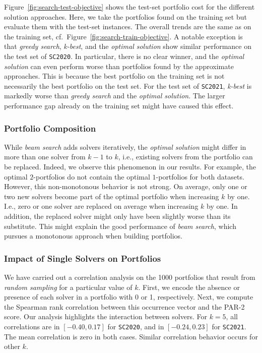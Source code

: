 \documentclass[a4paper,USenglish,pdfa]{lipics-v2021} %
\begin{document}
Figure~\ref{fig:search-test-objective} shows the test-set portfolio cost for the different solution approaches.
Here, we take the portfolios found on the training set but evaluate them with the test-set instances.
The overall trends are the same as on the training set, cf.~Figure~\ref{fig:search-train-objective}.
A notable exception is that \emph{greedy search}, \emph{k-best}, and the \emph{optimal solution} show similar performance on the test set of \texttt{SC2020}.
In particular, there is no clear winner, and the \emph{optimal solution} can even perform worse than portfolios found by the approximate approaches. 
This is because the best portfolio on the training set is not necessarily the best portfolio on the test set.
For the test set of \texttt{SC2021}, \emph{k-best} is markedly worse than \emph{greedy search} and the \emph{optimal solution}. 
The larger performance gap already on the training set might have caused this effect.

\subsubsection{Portfolio Composition}

While \emph{beam search} adds solvers iteratively, the \emph{optimal solution} might differ in more than one solver from $k-1$ to $k$, i.e., existing solvers from the portfolio can be replaced.
Indeed, we observe this phenomenon in our results.
For example, the optimal $2$-portfolios do not contain the optimal $1$-portfolios for both datasets.
However, this non-monotonous behavior is not strong.
On average, only one or two new solvers become part of the optimal portfolio when increasing $k$ by one.
I.e., zero or one solver are replaced on average when increasing $k$ by one.
In addition, the replaced solver might only have been slightly worse than its substitute.
This might explain the good performance of \emph{beam search}, which pursues a monotonous approach when building portfolios.

\subsubsection{Impact of Single Solvers on Portfolios}

We have carried out a correlation analysis on the 1000 portfolios that result from \emph{random sampling} for a particular value of $k$. 
First, we encode the absence or presence of each solver in a portfolio with 0 or 1, respectively.
Next, we compute the Spearman rank correlation between this occurrence vector and the PAR-2 score.
Our analysis highlights the interaction between solvers. 
For $k=5$, all correlations are in $[-0.40,0.17]$ for \texttt{SC2020}, and in $[-0.24,0.23]$ for \texttt{SC2021}.
The mean correlation is zero in both cases.
Similar correlation behavior occurs for other $k$.
\end{document}
